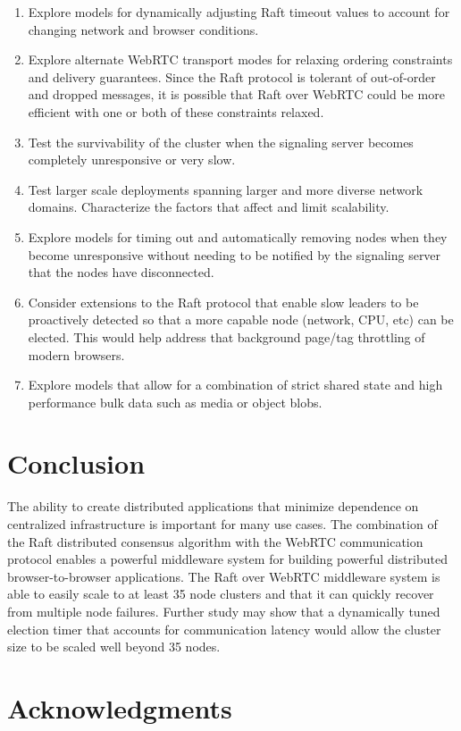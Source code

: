 \documentclass[conference,compsoc]{./IEEEtran/IEEEtran}
\begin{document}
\begin{enumerate}
\item Explore models for dynamically adjusting Raft timeout values to account for changing network and browser conditions.
\item Explore alternate WebRTC transport modes for relaxing ordering constraints and delivery guarantees. Since the Raft protocol is tolerant of out-of-order and dropped messages, it is possible that Raft over WebRTC could be more efficient with one or both of these constraints relaxed.
\item Test the survivability of the cluster when the signaling server becomes completely unresponsive or very slow.
\item Test larger scale deployments spanning larger and more diverse network domains. Characterize the factors that affect and limit scalability.
\item Explore models for timing out and automatically removing nodes when they become unresponsive without needing to be notified by the signaling server that the nodes have disconnected.
\item Consider extensions to the Raft protocol that enable slow leaders to be proactively detected so that a more capable node (network, CPU, etc) can be elected. This would help address that background page/tag throttling of modern browsers.
\item Explore models that allow for a combination of strict shared state and high performance bulk data such as media or object blobs.
\end{enumerate}


\section{Conclusion}

The ability to create distributed applications that minimize dependence on centralized infrastructure is important for many use cases. The combination of the Raft distributed consensus algorithm with the WebRTC communication protocol enables a powerful middleware system for building powerful distributed browser-to-browser applications. The Raft over WebRTC middleware system is able to easily scale to at least 35 node clusters and that it can quickly recover from multiple node failures. Further study may show that a dynamically tuned election timer that accounts for communication latency would allow the cluster size to be scaled well beyond 35 nodes.


\section*{Acknowledgments}
\end{document}
